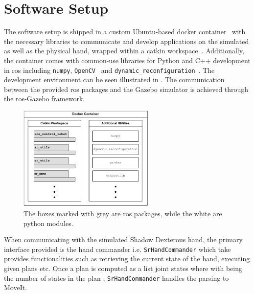 \section{Software Setup} \label{sec:system-setup-software-setup}

The software setup is shipped in a custom Ubuntu-based docker container~\cite{docker, ubuntu-docker-image} with the necessary libraries to communicate and develop applications on the simulated as well as the physical hand, wrapped within a catkin workspace~\cite{catkin}. Additionally, the container comes with common-use libraries for Python and C++ development in \gls{ros} including \texttt{numpy}\cite{numpy}, \texttt{OpenCV}~\cite{opencv} and \texttt{dynamic\_reconfiguration}~\cite{dynamic-reconfiguration}. The development environment can be seen illustrated in . The communication between the provided \gls{ros} packages and the Gazebo simulator is achieved through the \gls{ros}-Gazebo framework. 

\begin{figure}[h]
	\begin{small}
		\begin{center}
			\includegraphics[width=0.6\textwidth]{chapters/system-setup/fig/init-package-diagram.pdf}
		\end{center}
		\caption{The boxes marked with grey are \gls{ros} packages, while the white are python modules.}
		\label{fig:package-diagram}
	\end{small}
\end{figure}

When communicating with the simulated Shadow Dexterous hand, the primary interface provided is the hand commander i.e. \texttt{SrHandCommander} which take provides functionalities such as retrieving the current state of the hand, executing given plans etc. Once a plan  is computed as a list joint states  where  with  being the number of states in the plan , \texttt{SrHandCommander} handles the parsing to MoveIt.


